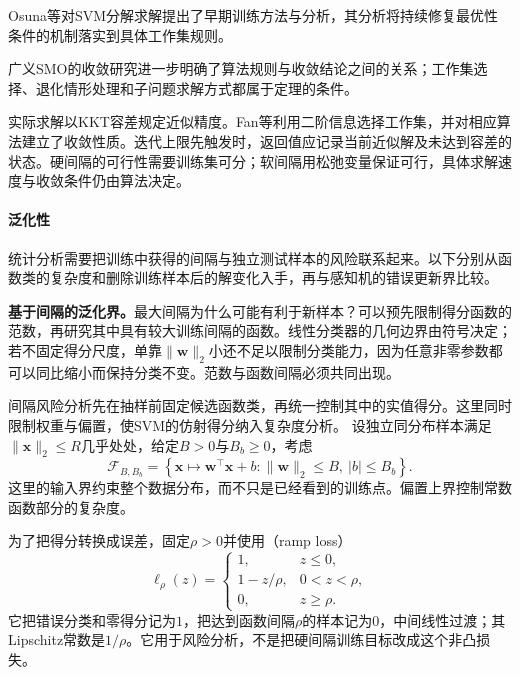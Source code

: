 Osuna等对SVM分解求解提出了早期训练方法与分析，其分析将持续修复最优性条件的机制落实到具体工作集规则。

广义SMO的收敛研究进一步明确了算法规则与收敛结论之间的关系；工作集选择、退化情形处理和子问题求解方式都属于定理的条件。

实际求解以KKT容差规定近似精度。Fan等利用二阶信息选择工作集，并对相应算法建立了收敛性质。迭代上限先触发时，返回值应记录当前近似解及未达到容差的状态。硬间隔的可行性需要训练集可分；软间隔用松弛变量保证可行，具体求解速度与收敛条件仍由算法决定。

\paragraph{泛化性}
\label{sec:classification-svm-generalization}

统计分析需要把训练中获得的间隔与独立测试样本的风险联系起来。以下分别从函数类的复杂度和删除训练样本后的解变化入手，再与感知机的错误更新界比较。

\label{sec:classification-svm-margin-generalization}

\textbf{基于间隔的泛化界。}最大间隔为什么可能有利于新样本？可以预先限制得分函数的范数，再研究其中具有较大训练间隔的函数。线性分类器的几何边界由符号决定；若不固定得分尺度，单靠$\lVert\bm{w}\rVert_2$小还不足以限制分类能力，因为任意非零参数都可以同比缩小而保持分类不变。范数与函数间隔必须共同出现。

间隔风险分析先在抽样前固定候选函数类，再统一控制其中的实值得分。这里同时限制权重与偏置，使SVM的仿射得分纳入复杂度分析。
设独立同分布样本满足$\lVert\bm{x}\rVert_2\le R$几乎处处，给定$B>0$与$B_b\ge0$，考虑
\[
  \mathcal{F}_{B,B_b}
  =\left\{
    \bm{x}\mapsto\bm{w}^{\top}\bm{x}+b:
    \lVert\bm{w}\rVert_2\le B,\ |b|\le B_b
   \right\}.
\]
这里的输入界约束整个数据分布，而不只是已经看到的训练点。偏置上界控制常数函数部分的复杂度。

为了把得分转换成误差，固定$\rho>0$并使用（ramp loss）
\begin{equation}
  \ell_\rho(z)=
  \begin{cases}
    1, & z\le0,\\
    1-z/\rho, & 0<z<\rho,\\
    0, & z\ge\rho.
  \end{cases}
  \label{eq:classification-svm-ramp}
\end{equation}
它把错误分类和零得分记为$1$，把达到函数间隔$\rho$的样本记为$0$，中间线性过渡；其Lipschitz常数是$1/\rho$。它用于风险分析，不是把硬间隔训练目标改成这个非凸损失。

